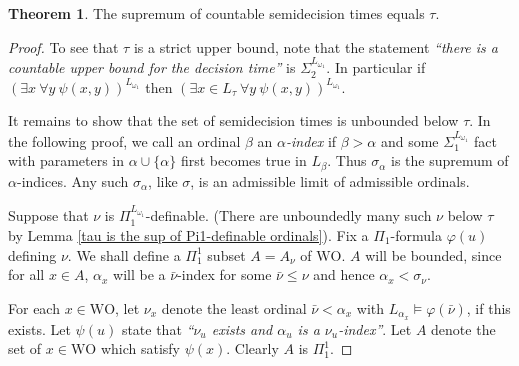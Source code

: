 \documentclass[a4paper,11pt]{amsart}
\theoremstyle{definition}
\newcommand{\WO}{\mathrm{WO}}
\newtheorem{theorem}[fact]{Theorem}
\newtheorem*{problem A}{Problem 1}
\newtheorem*{problem B}{Problem 2}
\theoremstyle{remark}
\begin{document}
\begin{theorem} 
\label{supremum of countable semidecision times} 
The supremum of countable semidecision times equals $\tau$. 
\end{theorem} 
\begin{proof} 
To see that $\tau$ is a strict upper bound, note that the statement \emph{``there is a countable upper bound for the decision time''} is $\Sigma_2^{L_{\omega_1}}$. 
In particular if $(\exists x\ \forall y\ \psi(x,y))^{L_{\omega_1}}$ then
$(\exists x \in L_{\tau}\ \forall y\ \psi(x,y))^{L_{\omega_1}}$.

It remains to show that the set of semidecision times is unbounded below $\tau$. 
In the following proof, we call an ordinal $\beta$ an \emph{$\alpha$-index} if $\beta>\alpha$ and some $\Sigma_1^{L_{\omega_1}}$ fact with parameters in $\alpha\cup\{\alpha\}$ first becomes true in $L_\beta$. 
Thus $\sigma_\alpha$ is the supremum of $\alpha$-indices. Any such $\sigma_{\alpha}$, like $\sigma$, is an admissible limit of admissible ordinals.


Suppose that $\nu$ is $\Pi_1^{L_{\omega_1}}$-definable. (There are unboundedly many such $\nu$ below $\tau$ by Lemma  \ref{tau is the sup of Pi1-definable ordinals}). 
Fix a $\Pi_1$-formula $\varphi(u)$ defining $\nu$. 
We shall define a $\Pi^1_1$ subset $A=A_\nu$ of $\WO$. 
$A$ will be bounded, since for all $x\in A$, $\alpha_x$ will be a $\bar{\nu}$-index for some $\bar{\nu}\leq\nu$ and hence $\alpha_x<\sigma_\nu$. 

For each $x\in \WO$, let $\nu_x$ denote the least ordinal $\bar{\nu}<\alpha_x$ with $L_{\alpha_x}\models \varphi(\bar{\nu})$, if this exists. 
Let $\psi(u)$ state that \emph{``$\nu_u$ exists and $\alpha_u$ is a $\nu_u$-index''}. 
Let $A$ denote the set of $x\in\WO$ which satisfy $\psi(x)$. 
Clearly $A$ is $\Pi^1_1$. 



\end{proof}
\end{document}
